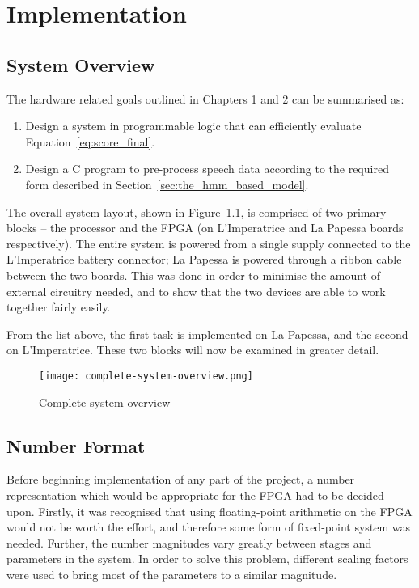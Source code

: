 \chapter{Implementation} %
\label{cha:system_design}

\section{System Overview} %
\label{sec:system_overview}
	The hardware related goals outlined in Chapters 1 and 2 can be summarised as:
	\begin{enumerate}
		\item Design a system in programmable logic that can efficiently evaluate Equation~\ref{eq:score_final}.
		\item Design a C program to pre-process speech data according to the required form described in Section~\ref{sec:the_hmm_based_model}.
	\end{enumerate}

	The overall system layout, shown in Figure~\ref{fig:hlsystem}, is comprised of two primary blocks -- the processor and the FPGA (on L'Imperatrice and La Papessa boards respectively).  The entire system is powered from a single supply connected to the L'Imperatrice battery connector; La Papessa is powered through a ribbon cable between the two boards.  This was done in order to minimise the amount of external circuitry needed, and to show that the two devices are able to work together fairly easily.

	From the list above, the first task is implemented on La Papessa, and the second on L'Imperatrice.  These two blocks will now be examined in greater detail.



	\begin{figure}[tb]
		\begin{center}
			\texttt{[image: complete-system-overview.png]}
		\end{center}
		\caption{Complete system overview}
		\label{fig:hlsystem}
	\end{figure}


\section{Number Format} %
\label{sec:number_format}
	Before beginning implementation of any part of the project, a number representation which would be appropriate for the FPGA had to be decided upon.  Firstly, it was recognised that using floating-point arithmetic on the FPGA would not be worth the effort, and therefore some form of fixed-point system was needed.  Further, the number magnitudes vary greatly between stages and parameters in the system.  In order to solve this problem, different scaling factors were used to bring most of the parameters to a similar magnitude.  

